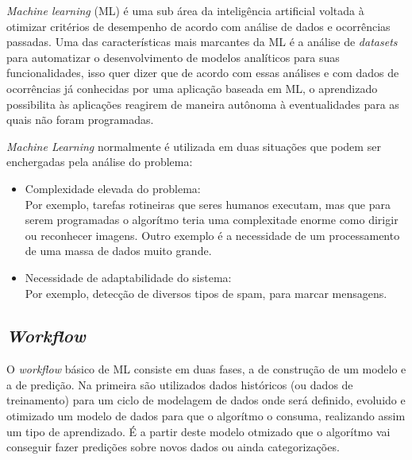 \textit{Machine learning} (ML) é uma sub área da inteligência artificial voltada à otimizar critérios de desempenho de acordo com análise de dados e ocorrências passadas. \cite{alpaydin2010} Uma das características mais marcantes da ML é a análise de \textit{datasets} para automatizar o desenvolvimento de modelos analíticos para suas funcionalidades, isso quer dizer que de acordo com essas análises e com dados de ocorrências já conhecidas por uma aplicação baseada em ML, o aprendizado possibilita às aplicações reagirem de maneira autônoma à eventualidades para as quais não foram programadas.

\textit{Machine Learning} normalmente é utilizada em duas situações que podem ser enchergadas pela análise do problema:

\begin{itemize}
    \item Complexidade elevada do problema: \\ Por exemplo, tarefas rotineiras que seres humanos executam, mas que para serem programadas o algorítmo teria uma complexitade enorme como dirigir ou reconhecer imagens. Outro exemplo é a necessidade de um processamento de uma massa de dados muito grande.
    \item Necessidade de adaptabilidade do sistema: \\ Por exemplo, detecção de diversos tipos de spam, para marcar mensagens. \\ \cite{shalev2014}
\end{itemize}

\subsection{\textit{Workflow}}
    O \textit{workflow} básico de ML consiste em duas fases, a de construção de um modelo e a de predição. Na primeira são utilizados dados históricos (ou dados de treinamento) para um ciclo de modelagem de dados onde será definido, evoluido e otimizado um modelo de dados para que o algorítmo o consuma, realizando assim um tipo de aprendizado. É a partir deste modelo otmizado que o algorítmo vai conseguir fazer predições sobre novos dados ou ainda categorizações.

